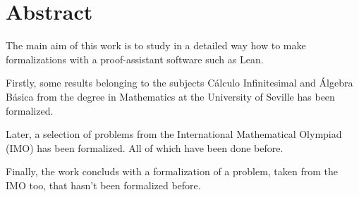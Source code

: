 \chapter*{Abstract}

The main aim of this work is to study in a detailed way
how to make formalizations with a proof-assistant software
such as Lean.

Firstly, some results belonging to the subjects Cálculo
Infinitesimal and Álgebra Básica from the degree in
Mathematics at the University of Seville has been
formalized.

Later, a selection of problems from the International
Mathematical Olympiad (IMO) has been formalized. All of
which have been done before.

Finally, the work concluds with a formalization of a
problem, taken from the IMO too, that hasn't been formalized
before.


